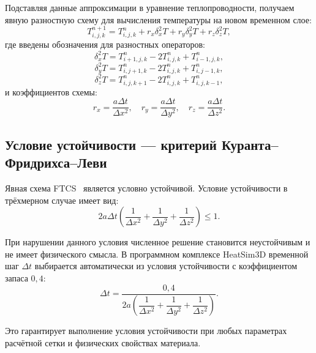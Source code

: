 Подставляя данные аппроксимации в уравнение теплопроводности, получаем 
явную разностную схему для вычисления температуры на новом временном 
слое:
\begin{equation}
    T_{i,j,k}^{n+1} = T_{i,j,k}^{n} + 
    r_x \delta_x^2 T + 
    r_y \delta_y^2 T + 
    r_z \delta_z^2 T,
\end{equation}
где введены обозначения для разностных операторов:
\begin{equation}
    \delta_x^2 T = T_{i+1,j,k}^{n} - 2T_{i,j,k}^{n} + T_{i-1,j,k}^{n},
\end{equation}
\begin{equation}
    \delta_y^2 T = T_{i,j+1,k}^{n} - 2T_{i,j,k}^{n} + T_{i,j-1,k}^{n},
\end{equation}
\begin{equation}
    \delta_z^2 T = T_{i,j,k+1}^{n} - 2T_{i,j,k}^{n} + T_{i,j,k-1}^{n},
\end{equation}
и коэффициентов схемы:
\begin{equation}
    r_x = \frac{a \Delta t}{\Delta x^2}, \quad
    r_y = \frac{a \Delta t}{\Delta y^2}, \quad
    r_z = \frac{a \Delta t}{\Delta z^2}.
\end{equation}

\subsection{Условие устойчивости --- критерий Куранта--Фридрихса--Леви}

Явная схема FTCS~\cite{dubey2015stability} является условно устойчивой. Условие устойчивости 
в трёхмерном случае имеет вид:
\begin{equation}
    2a \Delta t \left( 
    \frac{1}{\Delta x^2} + 
    \frac{1}{\Delta y^2} + 
    \frac{1}{\Delta z^2} 
    \right) \leq 1.
\end{equation}

При нарушении данного условия численное решение становится неустойчивым 
и не имеет физического смысла. В программном комплексе HeatSim3D 
временной шаг $\Delta t$ выбирается автоматически из условия 
устойчивости с коэффициентом запаса $0{,}4$:
\begin{equation}
    \Delta t = \frac{0{,}4}{2a \left( 
    \dfrac{1}{\Delta x^2} + 
    \dfrac{1}{\Delta y^2} + 
    \dfrac{1}{\Delta z^2} \right)}.
\end{equation}

Это гарантирует выполнение условия устойчивости при любых параметрах 
расчётной сетки и физических свойствах материала.

